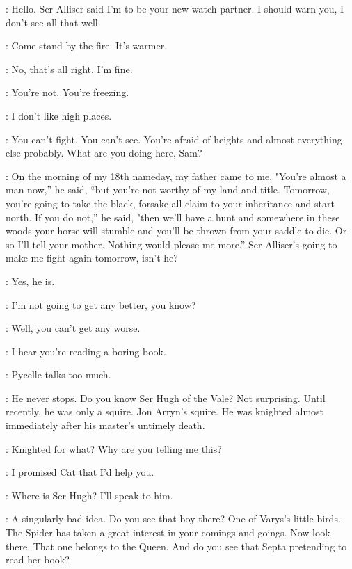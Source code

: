 \SAM: Hello. Ser Alliser said I'm to be your new watch partner. I should warn you, I don't see all that well. 

\JON: Come stand by the fire. It's warmer. 

\SAM: No, that's all right. I'm fine. 

\JON: You're not. You're freezing. 

\SAM: I don't like high places. 

\JON: You can't fight. You can't see. You're afraid of heights and almost everything else probably. What are you doing here, Sam? 

\SAM: On the morning of my 18th nameday, my father came to me. "You're almost a man now,'' he said, ``but you're not worthy of my land and title. Tomorrow, you're going to take the black, forsake all claim to your inheritance and start north. If you do not,'' he said, "then we'll have a hunt and somewhere in these woods your horse will stumble and you'll be thrown from your saddle to die. Or so I'll tell your mother. Nothing would please me more.'' Ser Alliser's going to make me fight again tomorrow, isn't he? 

\JON: Yes, he is. 

\SAM: I'm not going to get any better, you know? 

\JON: Well, you can't get any worse. 

\scene



\LITTLEFINGER: I hear you're reading a boring book. 

\NED: Pycelle talks too much. 

\LITTLEFINGER: He never stops. Do you know Ser Hugh of the Vale? Not surprising. Until recently, he was only a squire. Jon Arryn's squire. He was knighted almost immediately after his master's untimely death. 

\NED: Knighted for what? Why are you telling me this? 

\LITTLEFINGER: I promised Cat that I'd help you. 

\NED: Where is Ser Hugh? I'll speak to him. 

\LITTLEFINGER: A singularly bad idea. Do you see that boy there? One of Varys's little birds. The Spider has taken a great interest in your comings and goings. Now look there. That one belongs to the Queen. And do you see that Septa pretending to read her book? 

